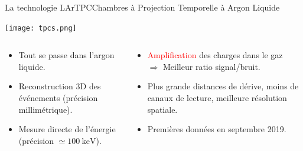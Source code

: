     \begin{frame}{La technologie LArTPC}{Chambres à Projection Temporelle à Argon Liquide}
       	\begin{scriptsize}
       			\texttt{[image: tpcs.png]}\\\vfill
       			\begin{columns}
       				\begin{column}{0.5\textwidth}
       					\begin{itemize}
       						\item Tout se passe dans l'argon liquide.
       						\item Reconstruction 3D des événements (précision millimétrique).
       						\item Mesure directe de l'énergie (précision $\simeq\SI{100}{\kilo\electronvolt}$).
       					\end{itemize}
       				\end{column}\hfill
       				\begin{column}{0.5\textwidth}
       					\begin{itemize}
       						\item \textcolor{red}{Amplification} des charges dans le gaz\\$\Rightarrow$ Meilleur ratio signal/bruit.
       						\item Plus grande distances de dérive, moins de canaux de lecture, meilleure résolution spatiale.
       						\item Premières données en septembre 2019.
       					\end{itemize}
       				\end{column}
       			\end{columns}
       	\end{scriptsize}
    \end{frame}
            
